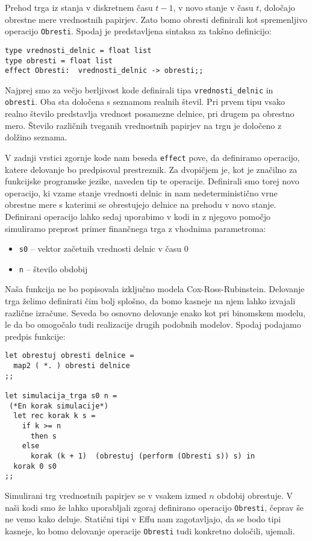 \documentclass[a4paper,12pt]{article}
\theoremstyle{definition} %
\begin{document}
Prehod trga iz stanja v diskretnem času $t - 1$, v novo stanje v času $t$, določajo obrestne mere vrednostnih papirjev. Zato bomo obresti definirali kot spremenljivo operacijo \lstinline{Obresti}. Spodaj je predstavljena sintaksa za takšno definicijo:
\begin{lstlisting}
type vrednosti_delnic = float list
type obresti = float list
effect Obresti:  vrednosti_delnic -> obresti;;
\end{lstlisting}
Najprej smo za večjo berljivost kode definirali tipa  \lstinline{vrednosti_delnic} in \lstinline{obresti}. Oba sta določena s seznamom  realnih števil. Pri prvem tipu vsako realno število predstavlja vrednost posamezne delnice, pri drugem pa obrestno mero. Število različnih tveganih vrednostnih papirjev na trgu je določeno z dolžino seznama.

V zadnji vrstici zgornje kode nam beseda \lstinline{effect}  pove, da definiramo operacijo, katere delovanje bo predpisoval prestreznik. Za dvopičjem je, kot je značilno za funkcijske programske jezike, naveden tip te operacije. Definirali smo torej novo operacijo, ki vzame stanje vrednosti delnic in nam nedeterministično vrne obrestne mere s katerimi se obrestujejo delnice na prehodu v novo stanje. Definirani operacijo lahko sedaj uporabimo v kodi in z njegovo pomočjo simuliramo preprost primer finančnega trga z vhodnima parametroma:
\begin{itemize}
\item \lstinline{s0} -- vektor začetnih vrednosti delnic v času 0
\item \lstinline{n} -- število obdobij
\end{itemize}
Naša funkcija ne bo popisovala izključno modela Cox-Ross-Rubinstein. Delovanje trga  želimo definirati čim bolj splošno, da bomo kasneje na njem lahko izvajali različne izračune. Seveda bo osnovno delovanje enako kot pri binomskem modelu, le da bo omogočalo tudi realizacije drugih podobnih modelov. Spodaj podajamo predpis funkcije:
\begin{lstlisting}
let obrestuj obresti delnice =
  map2 ( *. ) obresti delnice
;;

let simulacija_trga s0 n =
 (*En korak simulacije*)
  let rec korak k s =
    if k >= n
      then s
    else
      korak (k + 1)  (obrestuj (perform (Obresti s)) s) in
  korak 0 s0
;;
\end{lstlisting}
Simulirani trg vrednostnih papirjev se v vsakem izmed $n$ obdobij obrestuje. V naši kodi smo že lahko uporabljali zgoraj definirano operacijo \lstinline{Obresti}, čeprav še ne vemo kako deluje. Statični tipi v Effu nam zagotavljajo, da se bodo tipi kasneje, ko bomo delovanje operacije \lstinline{Obresti} tudi konkretno določili, ujemali. 
\end{document}
